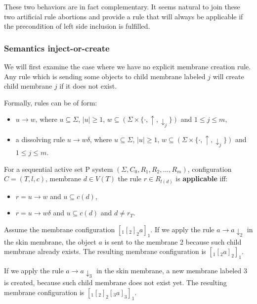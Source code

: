   These two behaviors are in fact complementary. It seems natural to join these two artificial rule abortions and provide a rule that will always be applicable if the precondition of left side inclusion is fulfilled.

  \subsubsection{Semantics inject-or-create} %
  \label{ssub:semantics_inject_or_create}
    
    We will first examine the case where we have no explicit membrane creation rule. Any rule which is sending some objects to child membrane labeled $j$ will create child membrane $j$ if it does not exist.

    Formally, rules can be of form:
    \begin{itemize}
      \item $u\rightarrow w$, where $u\subseteq \Sigma$, $|u|\geq 1$, $w\subseteq (\Sigma\times\{\cdot, \uparrow, \downarrow_j\})$ and $1\leq j\leq m$,
      \item a dissolving rule $u\rightarrow w\delta$, where $u\subseteq \Sigma$, $|u|\geq 1$, $w\subseteq (\Sigma\times\{\cdot, \uparrow, \downarrow_j\})$ and $1\leq j\leq m$.
    \end{itemize}

    For a sequential active set P system $(\Sigma, C_0, R_1, R_2, \dots , R_m)$, configuration $C = (T, l, c)$, membrane $d\in V(T)$ the rule $r\in R_{l(d)}$ is {\bf applicable} iff:
    \begin{itemize}
      \item $r = u\rightarrow w$ and $u\subseteq c(d)$,
      \item $r = u\rightarrow w\delta$ and $u\subseteq c(d)$ and $d\neq r_T$.
    \end{itemize}

    \begin{example}
      Assume the membrane configuration $[_1 [_2 ]_2 a ]_1$. If we apply the rule $a \rightarrow a\downarrow_2$ in the skin membrane, the object $a$ is sent to the membrane 2 because such child membrane already exists. The resulting membrane configuration is $[_1 [_2 a ]_2 ]_1$.

      If we apply the rule $a \rightarrow a\downarrow_3$ in the skin membrane, a new membrane labeled 3 is created, because such child membrane does not exist yet. The resulting membrane configuration is $[_1 [_2 ]_2 [_3 a ]_3 ]_1$.
    \end{example}

